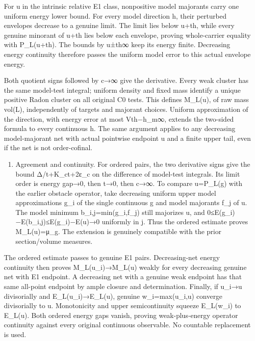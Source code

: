 \documentclass[
  10pt,
]{article}
\providecommand{\tightlist}{%
  \setlength{\itemsep}{0pt}\setlength{\parskip}{0pt}}
\begin{document}
For u in the intrinsic relative E1 class, nonpositive model majorants
carry one uniform energy lower bound. For every model direction h, their
perturbed envelopes decrease to a genuine limit. The limit lies below
u+th, while every genuine minorant of u+th lies below each envelope,
proving whole-carrier equality with P\_L(u+th). The bounds by
u±\textbar t\textbar\textbar\textbar h\textbar\textbar∞ keep its energy
finite. Decreasing energy continuity therefore passes the uniform model
error to this actual envelope energy.

Both quotient signs followed by c→∞ give the derivative. Every weak
cluster has the same model-test integral; uniform density and fixed mass
identify a unique positive Radon cluster on all original C0 tests. This
defines M\_L(u), of raw mass vol(L), independently of targets and
majorant choices. Uniform approximation of the direction, with energy
error at most
V\textbar t\textbar\textbar\textbar h−h\_m\textbar\textbar∞, extends the
two-sided formula to every continuous h. The same argument applies to
any decreasing model-majorant net with actual pointwise endpoint u and a
finite upper tail, even if the net is not order-cofinal.

\begin{enumerate}
\def\labelenumi{\arabic{enumi}.}
\setcounter{enumi}{9}
\tightlist
\item
  Agreement and continuity. For ordered pairs, the two derivative signs
  give the bound Δ/\textbar t\textbar+K\_c\textbar t\textbar+2ε\_c on
  the difference of model-test integrals. Its limit order is energy
  gap→0, then t→0, then c→∞. To compare u=P\_L(g) with the earlier
  obstacle operator, take decreasing uniform upper model approximations
  g\_i of the single continuous g and model majorants f\_j of u. The
  model minimum b\_i,j=min(g\_i,f\_j) still majorizes u, and
  0≤E(g\_i)−E(b\_i,j)≤E(g\_i)−E(u)→0 uniformly in j. Thus the ordered
  estimate proves M\_L(u)=μ\_g. The extension is genuinely compatible
  with the prior section/volume measures.
\end{enumerate}

The ordered estimate passes to genuine E1 pairs. Decreasing-net energy
continuity then proves M\_L(u\_i)→M\_L(u) weakly for every decreasing
genuine net with E1 endpoint. A decreasing net with a genuine weak
endpoint has that same all-point endpoint by ample closure and
determination. Finally, if u\_i→u divisorially and E\_L(u\_i)→E\_L(u),
genuine w\_i=max(u\_i,u) converge divisorially to u. Monotonicity and
upper semicontinuity squeeze E\_L(w\_i) to E\_L(u). Both ordered energy
gaps vanish, proving weak-plus-energy operator continuity against every
original continuous observable. No countable replacement is used.
\end{document}
